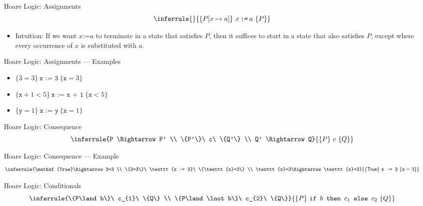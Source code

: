 \documentclass{beamer}
\begin{document}
\begin{frame}{Hoare Logic: Assignments}
  \[
    \inferrule{ }{\{P[x\mapsto a]\}\ x\mathbin{\texttt{:=}}a\ \{P\}}
  \]
  \begin{itemize}
    \item Intuition: If we want $x\mathbin{\texttt{:=}}a$ to terminate in a
      state that satisfies $P$, then it suffices to start in a state that also
      satisfies $P$, except where every occurrence of $x$ is substituted with $a$.
  \end{itemize}
\end{frame}

\begin{frame}{Hoare Logic: Assignments --- Examples}
  \begin{itemize}
    \item $\{3=3\}\ \texttt{x := 3}\ \{\texttt{x}=3\}$
    \item $\{\texttt{x}+1<5\}\ \texttt{x := x + 1}\ \{\texttt{x}<5\}$
    \item $\{\texttt{y}=1\}\ \texttt{x := y}\ \{\texttt{x}=1\}$
  \end{itemize}
\end{frame}

\begin{frame}{Hoare Logic: Consequence}
  \[
    \inferrule{P \Rightarrow P' \\
               \{P'\}\ c\ \{Q'\} \\
               Q' \Rightarrow Q}
              {\{P\}\ c\ \{Q\}}
  \]
\end{frame}

\begin{frame}{Hoare Logic: Consequence --- Example}
  \[
    \inferrule{\mathsf{True}\Rightarrow 3=3 \\
               \{3=3\}\ \texttt{x := 3}\ \{\texttt{x}=3\} \\
               \texttt{x}=3\Rightarrow\texttt{x}=3}
              {\{\mathsf{True}\}\ \texttt{x := 3}\ \{\texttt{x}=3\}}
  \]
\end{frame}

\begin{frame}{Hoare Logic: Conditionals}
  \[
    \inferrule{\{P\land b\}\ c_{1}\ \{Q\} \\
               \{P\land\lnot b\}\ c_{2}\ \{Q\}}
              {\{P\}\ \texttt{if }b\texttt{ then }c_{1}
                 \texttt{ else }c_{2}\ \{Q\}}
  \]
\end{frame}
\end{document}
